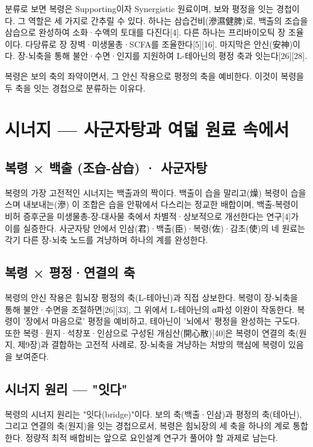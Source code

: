 \documentclass[12pt,oneside]{book}
\begin{document}
분류로 보면 복령은 Supporting이자 Synergistic 원료이며, 보와 평정을 잇는 경첩이다. 그 역할은 세 가지로 간추릴 수 있다. 하나는 삼습건비(滲濕健脾)로, 백출의 조습을 삼습으로 완성하여 소화·수액의 토대를 다진다[4]. 다른 하나는 프리바이오틱 장 조율이다. 다당류로 장 장벽·미생물총·SCFA를 조율한다[5][16]. 마지막은 안신(安神)이다. 장-뇌축을 통해 불안·수면·인지를 지원하여 L-테아닌의 평정 축과 잇는다[26][28].

복령은 보의 축의 좌약이면서, 그 안신 작용으로 평정의 축을 예비한다. 이것이 복령을 두 축을 잇는 경첩으로 분류하는 이유다.

\section{시너지 — 사군자탕과 여덟 원료 속에서}

\subsection{복령 × 백출 (조습-삼습) · 사군자탕}

복령의 가장 고전적인 시너지는 백출과의 짝이다. 백출이 습을 말리고(燥) 복령이 습을 스며 내보내는(滲) 이 조합은 습을 안팎에서 다스리는 정교한 배합이며, 백출-복령이 비허 증후군을 미생물총-장-대사물 축에서 차별적·상보적으로 개선한다는 연구[4]가 이를 실증한다. 사군자탕 안에서 인삼(君)·백출(臣)·복령(佐)·감초(使)의 네 원료는 각기 다른 장-뇌축 노드를 겨냥하며 하나의 계를 완성한다.

\subsection{복령 × 평정·연결의 축}

복령의 안신 작용은 힘뇌장 평정의 축(L-테아닌)과 직접 상보한다. 복령이 장-뇌축을 통해 불안·수면을 조절하면[26][33], 그 위에서 L-테아닌의 α파성 이완이 작동한다. 복령이 '장에서 마음으로' 평정을 예비하고, 테아닌이 '뇌에서' 평정을 완성하는 구도다. 또한 복령·원지·석창포·인삼으로 구성된 개심산(開心散)[40]은 복령이 연결의 축(원지, 제9장)과 결합하는 고전적 사례로, 장-뇌축을 겨냥하는 처방의 핵심에 복령이 있음을 보여준다.

\subsection{시너지 원리 — "잇다"}

복령의 시너지 원리는 "잇다(bridge)"이다. 보의 축(백출·인삼)과 평정의 축(테아닌), 그리고 연결의 축(원지)을 잇는 경첩으로서, 복령은 힘뇌장의 세 축을 하나의 계로 통합한다. 정량적 최적 배합비는 앞으로 요인설계 연구가 풀어야 할 과제로 남는다.
\end{document}
